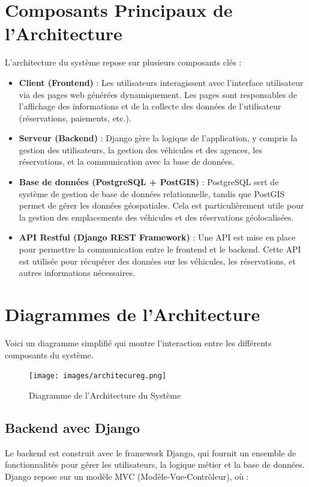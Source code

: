 \section{Composants Principaux de l'Architecture}
L'architecture du système repose sur plusieurs composants clés :
\begin{itemize}
    \item \textbf{Client (Frontend)} : Les utilisateurs interagissent avec l'interface utilisateur via des pages web générées dynamiquement. Les pages sont responsables de l'affichage des informations et de la collecte des données de l'utilisateur (réservations, paiements, etc.).
    \item \textbf{Serveur (Backend)} : Django gère la logique de l'application, y compris la gestion des utilisateurs, la gestion des véhicules et des agences, les réservations, et la communication avec la base de données.
    \item \textbf{Base de données (PostgreSQL + PostGIS)} : PostgreSQL sert de système de gestion de base de données relationnelle, tandis que PostGIS permet de gérer les données géospatiales. Cela est particulièrement utile pour la gestion des emplacements des véhicules et des réservations géolocalisées.
    \item \textbf{API Restful (Django REST Framework)} : Une API est mise en place pour permettre la communication entre le frontend et le backend. Cette API est utilisée pour récupérer des données sur les véhicules, les réservations, et autres informations nécessaires.
\end{itemize}

\section{Diagrammes de l'Architecture}
Voici un diagramme simplifié qui montre l'interaction entre les différents composants du système.

\begin{figure}[h!]
    \centering
    \texttt{[image: images/architecureg.png]}
    \caption{Diagramme de l'Architecture du Système}
    \label{fig:system_architecture}
\end{figure}

\subsection{Backend avec Django}
Le backend est construit avec le framework Django, qui fournit un ensemble de fonctionnalités pour gérer les utilisateurs, la logique métier et la base de données. Django repose sur un modèle MVC (Modèle-Vue-Contrôleur), où :

